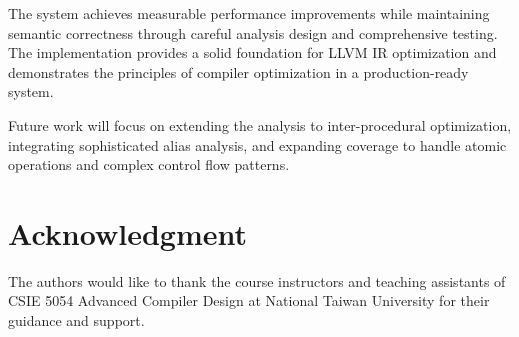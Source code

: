 \documentclass[journal]{IEEEtran}
\begin{document}
The system achieves measurable performance improvements while maintaining semantic correctness through careful analysis design and comprehensive testing. The implementation provides a solid foundation for LLVM IR optimization and demonstrates the principles of compiler optimization in a production-ready system.

Future work will focus on extending the analysis to inter-procedural optimization, integrating sophisticated alias analysis, and expanding coverage to handle atomic operations and complex control flow patterns.

\section*{Acknowledgment}

The authors would like to thank the course instructors and teaching assistants of CSIE 5054 Advanced Compiler Design at National Taiwan University for their guidance and support.

\end{document}
